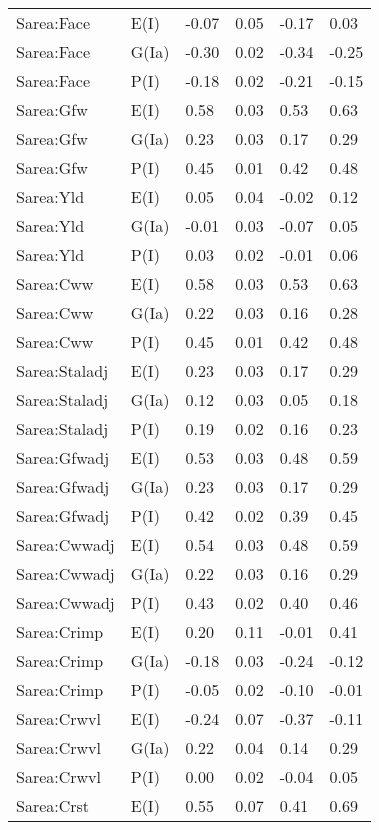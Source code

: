 \begin{center}
\begin{longtable}{|p{1.1in}|p{0.7in}|p{0.7in}|p{0.6in}|p{0.6in}|p{0.6in}|}
  Sarea:Face & E(I) & -0.07 & 0.05 & -0.17 & 0.03 \\ 
  Sarea:Face & G(Ia) & -0.30 & 0.02 & -0.34 & -0.25 \\ 
  Sarea:Face & P(I) & -0.18 & 0.02 & -0.21 & -0.15 \\ 
  Sarea:Gfw & E(I) & 0.58 & 0.03 & 0.53 & 0.63 \\ 
  Sarea:Gfw & G(Ia) & 0.23 & 0.03 & 0.17 & 0.29 \\ 
  Sarea:Gfw & P(I) & 0.45 & 0.01 & 0.42 & 0.48 \\ 
  Sarea:Yld & E(I) & 0.05 & 0.04 & -0.02 & 0.12 \\ 
  Sarea:Yld & G(Ia) & -0.01 & 0.03 & -0.07 & 0.05 \\ 
  Sarea:Yld & P(I) & 0.03 & 0.02 & -0.01 & 0.06 \\ 
  Sarea:Cww & E(I) & 0.58 & 0.03 & 0.53 & 0.63 \\ 
  Sarea:Cww & G(Ia) & 0.22 & 0.03 & 0.16 & 0.28 \\ 
  Sarea:Cww & P(I) & 0.45 & 0.01 & 0.42 & 0.48 \\ 
  Sarea:Staladj & E(I) & 0.23 & 0.03 & 0.17 & 0.29 \\ 
  Sarea:Staladj & G(Ia) & 0.12 & 0.03 & 0.05 & 0.18 \\ 
  Sarea:Staladj & P(I) & 0.19 & 0.02 & 0.16 & 0.23 \\ 
  Sarea:Gfwadj & E(I) & 0.53 & 0.03 & 0.48 & 0.59 \\ 
  Sarea:Gfwadj & G(Ia) & 0.23 & 0.03 & 0.17 & 0.29 \\ 
  Sarea:Gfwadj & P(I) & 0.42 & 0.02 & 0.39 & 0.45 \\ 
  Sarea:Cwwadj & E(I) & 0.54 & 0.03 & 0.48 & 0.59 \\ 
  Sarea:Cwwadj & G(Ia) & 0.22 & 0.03 & 0.16 & 0.29 \\ 
  Sarea:Cwwadj & P(I) & 0.43 & 0.02 & 0.40 & 0.46 \\ 
  Sarea:Crimp & E(I) & 0.20 & 0.11 & -0.01 & 0.41 \\ 
  Sarea:Crimp & G(Ia) & -0.18 & 0.03 & -0.24 & -0.12 \\ 
  Sarea:Crimp & P(I) & -0.05 & 0.02 & -0.10 & -0.01 \\ 
  Sarea:Crwvl & E(I) & -0.24 & 0.07 & -0.37 & -0.11 \\ 
  Sarea:Crwvl & G(Ia) & 0.22 & 0.04 & 0.14 & 0.29 \\ 
  Sarea:Crwvl & P(I) & 0.00 & 0.02 & -0.04 & 0.05 \\ 
  Sarea:Crst & E(I) & 0.55 & 0.07 & 0.41 & 0.69 \\ 

\end{longtable}
\end{center}
